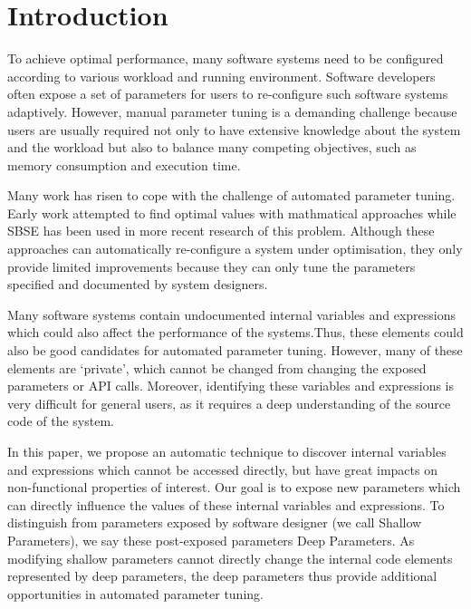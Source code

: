 
\section{Introduction}

To achieve optimal performance, many software systems need to be configured according to various workload and running environment. 
Software developers often expose a set of parameters for users to re-configure such software systems adaptively.
However, manual parameter tuning is a demanding challenge because users are usually required not only to have extensive knowledge about the system and the workload but also to balance many competing objectives, such as memory consumption and execution time.

Many work has risen to cope with the challenge of automated parameter tuning\cite{Hoffmann:2011:DKR:1961296.1950390}. Early work attempted to find optimal values with mathmatical approaches \cite{Vuduc01statisticalmodels,autotuning,Whaley:1998:ATL:509058.509096,Tapus:2002:AHT:762761.762771} while SBSE\cite{Harman:2007:CSF:1253532.1254729} has been used in more recent research \cite{hutter2009paramils,arcuri-ssbse-2011,Hoffmann:2011:DKR:1961296.1950390} of this problem. Although these approaches can automatically re-configure a system under optimisation, they only provide limited improvements because they can only tune the parameters specified and documented by system designers.


Many software systems contain undocumented internal variables and expressions which could also affect the performance of the systems.Thus, these elements could also be good candidates for automated parameter tuning. However, many of these elements are `private', which cannot be changed from changing the exposed parameters or API calls. Moreover, identifying these variables and expressions is very difficult for general users, as it requires a deep understanding of the source code of the system. 


In this paper, we propose an automatic technique to discover internal variables and expressions which cannot be accessed directly, but have great impacts on non-functional properties of interest. Our goal is to expose new parameters which can directly influence the values of these internal variables and expressions. To distinguish from parameters exposed by software designer (we call Shallow Parameters), we say these post-exposed parameters Deep Parameters. As modifying shallow parameters cannot directly change the internal code elements represented by deep parameters, the deep parameters thus provide additional opportunities in automated parameter tuning.


